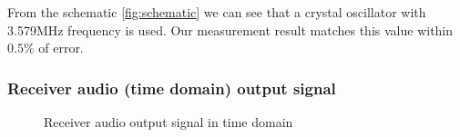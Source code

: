 \documentclass[
11pt, %
a4paper, %
oneside, %
headinclude,footinclude, %
BCOR5mm, %
]{scrartcl}
\begin{document}
From the schematic \ref{fig:schematic} we can see that a crystal oscillator with 3.579MHz frequency is used.
Our measurement result matches this value within $0.5\%$ of error.


\newpage
\subsubsection{Receiver audio (time domain) output signal}

\begin{figure}[h!]
    \centering
     \quad
     \quad
 
    \caption{Receiver audio output signal in time domain}
    \label{fig:Receiver audio output}
  \end{figure}
\end{document}
